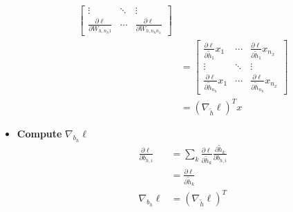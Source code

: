 \documentclass{article}
\begin{document}
\begin{itemize}
\begin{align*}
\begin{bmatrix}
\vdots & \ddots & \vdots \\
\frac{\partial \ell}{\partial W_{h,n_h 1}} & \cdots & \frac{\partial \ell}{\partial W_{h,n_h n_x}}
\end{bmatrix}\\
&=\begin{bmatrix} 
\frac{\partial \ell}{\partial \tilde{h}_1} x_1 & \cdots & \frac{\partial \ell}{\partial \tilde{h}_1} x_{n_x} \\
\vdots & \ddots & \vdots \\
\frac{\partial \ell}{\partial \tilde{h}_{n_h}} x_1 & \cdots & \frac{\partial \ell}{\partial \tilde{h}_{n_h}} x_{n_x}
\end{bmatrix}\\
&=(\nabla_{\tilde{h}} \ell)^T x
    \end{align*}
    \item \textbf{Compute} \(\nabla_{b_h} \ell\)
\begin{align*}
    \frac{\partial \ell}{\partial b_{h,i}}
    &= \sum_k \frac{\partial \ell}{\partial \tilde{h}_k} \frac{\partial \tilde{h}_k}{\partial b_{h,i}}\\
    &= \frac{\partial \ell}{\partial \tilde{h}_k}\\
    \nabla_{b_h} \ell &= (\nabla_{\tilde{h}} \ell)^T
\end{align*}  
\end{itemize}
\end{document}
